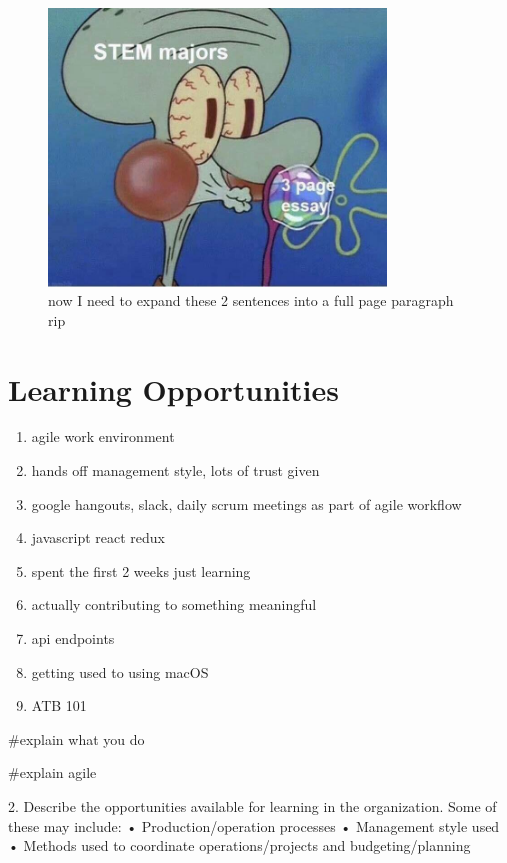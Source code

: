 \documentclass[letterpaper,12pt]{article}
\begin{document}
\begin{figure}[ht]
 \centering
 \includegraphics[width=0.8\textwidth]{stem.jpg}
 \caption{now I need to expand these 2 sentences into a full page paragraph rip}
\end{figure}

\section{Learning Opportunities}
\begin{enumerate}
 \item agile work environment
 \item hands off management style, lots of trust given
 \item google hangouts, slack, daily scrum meetings as part of agile workflow
 \item javascript react redux
 \item spent the first 2 weeks just learning
 \item actually contributing to something meaningful
 \item api endpoints
 \item getting used to using macOS
 \item ATB 101
\end{enumerate}

\#explain what you do

\#explain agile

2.	Describe the opportunities available for learning in the organization. Some of these may include:
•	Production/operation processes
•	Management style used
•	Methods used to coordinate operations/projects and budgeting/planning
\end{document}
